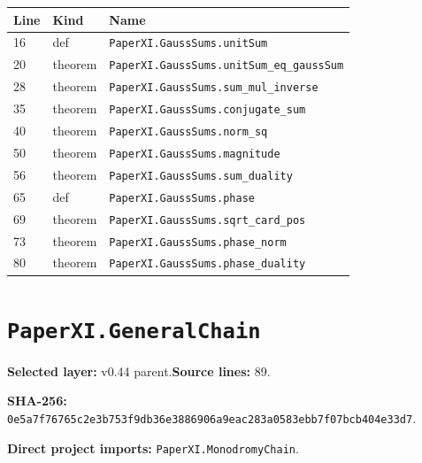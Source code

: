 \documentclass[10pt,oneside]{book}
\begin{document}
\begin{longtable}{@{}p{}p{}p{}@{}}\toprule Line&Kind&Name\\\midrule\endhead

16&def&\nolinkurl{PaperXI.GaussSums.unitSum}\\

20&theorem&\nolinkurl{PaperXI.GaussSums.unitSum_eq_gaussSum}\\

28&theorem&\nolinkurl{PaperXI.GaussSums.sum_mul_inverse}\\

35&theorem&\nolinkurl{PaperXI.GaussSums.conjugate_sum}\\

40&theorem&\nolinkurl{PaperXI.GaussSums.norm_sq}\\

50&theorem&\nolinkurl{PaperXI.GaussSums.magnitude}\\

56&theorem&\nolinkurl{PaperXI.GaussSums.sum_duality}\\

65&def&\nolinkurl{PaperXI.GaussSums.phase}\\

69&theorem&\nolinkurl{PaperXI.GaussSums.sqrt_card_pos}\\

73&theorem&\nolinkurl{PaperXI.GaussSums.phase_norm}\\

80&theorem&\nolinkurl{PaperXI.GaussSums.phase_duality}\\

\bottomrule\end{longtable}

\section{\texorpdfstring{\nolinkurl{PaperXI.GeneralChain}}{PaperXI.GeneralChain}}\label{module:PaperXI.GeneralChain}

\textbf{Selected layer:} v0.44 parent.\quad\textbf{Source lines:} 89.\par\textbf{SHA-256:} {\scriptsize\nolinkurl{0e5a7f76765c2e3b753f9db36e3886906a9eac283a0583ebb7f07bcb404e33d7}}.


\textbf{Direct project imports:} \nolinkurl{PaperXI.MonodromyChain}.
\end{document}
